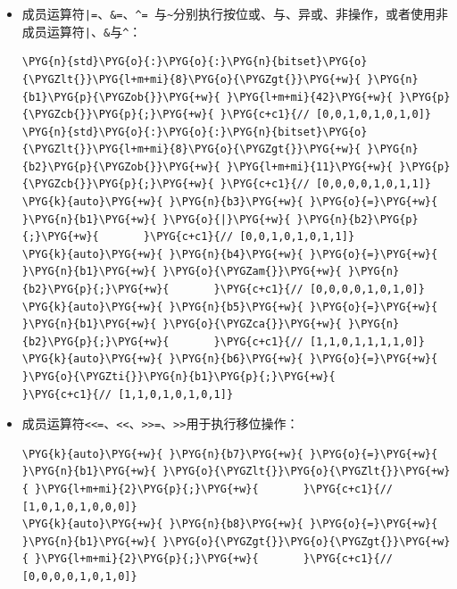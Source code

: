 \begin{itemize}
\item 成员运算符\texttt{|=}、\texttt{\&=}、\texttt{\textasciicircum{}= }与\texttt{\textasciitilde{}}分别执行按位或、与、异或、非操作，或者使用非成员运算符\texttt{|}、\texttt{\&}与\texttt{\textasciicircum{}}：



\begin{codeblockbg}
\begin{Verbatim}[commandchars=\\\{\},breaklines=true,breakanywhere=true,fontsize=\codefont,xleftmargin=17bp]
\PYG{n}{std}\PYG{o}{:}\PYG{o}{:}\PYG{n}{bitset}\PYG{o}{\PYGZlt{}}\PYG{l+m+mi}{8}\PYG{o}{\PYGZgt{}}\PYG{+w}{ }\PYG{n}{b1}\PYG{p}{\PYGZob{}}\PYG{+w}{ }\PYG{l+m+mi}{42}\PYG{+w}{ }\PYG{p}{\PYGZcb{}}\PYG{p}{;}\PYG{+w}{ }\PYG{c+c1}{// [0,0,1,0,1,0,1,0]}
\PYG{n}{std}\PYG{o}{:}\PYG{o}{:}\PYG{n}{bitset}\PYG{o}{\PYGZlt{}}\PYG{l+m+mi}{8}\PYG{o}{\PYGZgt{}}\PYG{+w}{ }\PYG{n}{b2}\PYG{p}{\PYGZob{}}\PYG{+w}{ }\PYG{l+m+mi}{11}\PYG{+w}{ }\PYG{p}{\PYGZcb{}}\PYG{p}{;}\PYG{+w}{ }\PYG{c+c1}{// [0,0,0,0,1,0,1,1]}
\PYG{k}{auto}\PYG{+w}{ }\PYG{n}{b3}\PYG{+w}{ }\PYG{o}{=}\PYG{+w}{ }\PYG{n}{b1}\PYG{+w}{ }\PYG{o}{|}\PYG{+w}{ }\PYG{n}{b2}\PYG{p}{;}\PYG{+w}{       }\PYG{c+c1}{// [0,0,1,0,1,0,1,1]}
\PYG{k}{auto}\PYG{+w}{ }\PYG{n}{b4}\PYG{+w}{ }\PYG{o}{=}\PYG{+w}{ }\PYG{n}{b1}\PYG{+w}{ }\PYG{o}{\PYGZam{}}\PYG{+w}{ }\PYG{n}{b2}\PYG{p}{;}\PYG{+w}{       }\PYG{c+c1}{// [0,0,0,0,1,0,1,0]}
\PYG{k}{auto}\PYG{+w}{ }\PYG{n}{b5}\PYG{+w}{ }\PYG{o}{=}\PYG{+w}{ }\PYG{n}{b1}\PYG{+w}{ }\PYG{o}{\PYGZca{}}\PYG{+w}{ }\PYG{n}{b2}\PYG{p}{;}\PYG{+w}{       }\PYG{c+c1}{// [1,1,0,1,1,1,1,0]}
\PYG{k}{auto}\PYG{+w}{ }\PYG{n}{b6}\PYG{+w}{ }\PYG{o}{=}\PYG{+w}{ }\PYG{o}{\PYGZti{}}\PYG{n}{b1}\PYG{p}{;}\PYG{+w}{           }\PYG{c+c1}{// [1,1,0,1,0,1,0,1]}
\end{Verbatim}
\end{codeblockbg}



\item 成员运算符\texttt{<<\allowbreak{}=}、\texttt{<<}、\texttt{>>\allowbreak{}=}、\texttt{>>}用于执行移位操作：



\begin{codeblockbg}
\begin{Verbatim}[commandchars=\\\{\},breaklines=true,breakanywhere=true,fontsize=\codefont,xleftmargin=17bp]
\PYG{k}{auto}\PYG{+w}{ }\PYG{n}{b7}\PYG{+w}{ }\PYG{o}{=}\PYG{+w}{ }\PYG{n}{b1}\PYG{+w}{ }\PYG{o}{\PYGZlt{}}\PYG{o}{\PYGZlt{}}\PYG{+w}{ }\PYG{l+m+mi}{2}\PYG{p}{;}\PYG{+w}{       }\PYG{c+c1}{// [1,0,1,0,1,0,0,0]}
\PYG{k}{auto}\PYG{+w}{ }\PYG{n}{b8}\PYG{+w}{ }\PYG{o}{=}\PYG{+w}{ }\PYG{n}{b1}\PYG{+w}{ }\PYG{o}{\PYGZgt{}}\PYG{o}{\PYGZgt{}}\PYG{+w}{ }\PYG{l+m+mi}{2}\PYG{p}{;}\PYG{+w}{       }\PYG{c+c1}{// [0,0,0,0,1,0,1,0]}
\end{Verbatim}
\end{codeblockbg}



\end{itemize}
